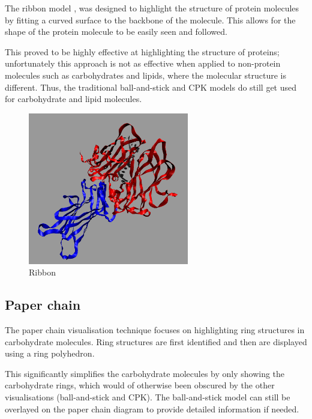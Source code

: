 The ribbon model \citep{richardson81}, \citep{carson87} was designed to
highlight the structure of protein molecules by fitting a curved surface to the
backbone of the molecule. This allows for the shape of the protein molecule to
be easily seen and followed.

This proved to be highly effective at highlighting the structure of proteins;
unfortunately this approach is not as effective when applied to non-protein
molecules such as carbohydrates and lipids, where the molecular structure is
different. Thus, the traditional ball-and-stick and CPK models do still get
used for carbohydrate and lipid molecules.

\begin{figure}[h!]
  \begin{center}
    \includegraphics[width=70mm]{ribbon}
  \end{center}
  \caption{Ribbon}
  \label{fig:ribbon}
\end{figure}


\subsection*{Paper chain}
\label{ssub:paper_chain}

The paper chain visualisation technique \citep{kuttel06} focuses on highlighting
ring structures in carbohydrate molecules. Ring structures are first identified
and then are displayed using a ring polyhedron.

This significantly simplifies the carbohydrate molecules by only showing the
carbohydrate rings, which would of otherwise been obscured by the other
visualisations (ball-and-stick and CPK). The ball-and-stick model can still be
overlayed on the paper chain diagram to provide detailed information if needed.

